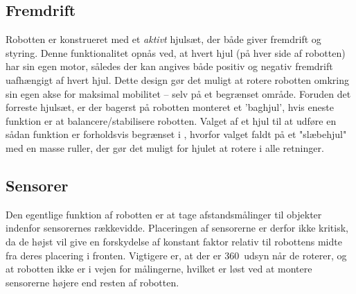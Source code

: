 \subsection{Fremdrift}
Robotten er konstrueret med et \textit{aktivt} hjulsæt, der både giver fremdrift og styring.
Denne funktionalitet opnås ved, at hvert hjul (på hver side af robotten) har sin egen motor, således der kan angives både positiv og negativ fremdrift uafhængigt af hvert hjul.
Dette design gør det muligt at rotere robotten omkring sin egen akse for maksimal mobilitet -- selv på et begrænset område.
Foruden det forreste hjulsæt, er der bagerst på robotten monteret et 'baghjul', hvis eneste funktion er at balancere/stabilisere robotten.
Valget af et hjul til at udføre en sådan funktion er forholdsvis begrænset i \lego, hvorfor valget faldt på et "slæbehjul" med en masse ruller, der gør det muligt for hjulet at rotere i alle retninger.

\subsection{Sensorer}
Den egentlige funktion af robotten er at tage afstandsmålinger til objekter indenfor sensorernes rækkevidde.
Placeringen af sensorerne er derfor ikke kritisk, da de højst vil give en forskydelse af konstant faktor relativ til robottens midte fra deres placering i fronten.
Vigtigere er, at der er 360\degree~udsyn når de roterer, og at robotten ikke er i vejen for målingerne, hvilket er løst ved at montere sensorerne højere end resten af robotten.
